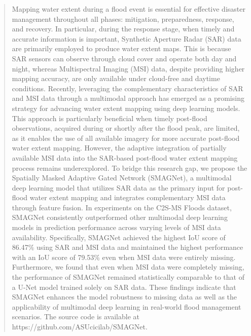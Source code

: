 \documentclass[preprint,12pt,authoryear]{elsarticle}
\begin{document}
\begin{frontmatter}
\begin{abstract}
Mapping water extent during a flood event is essential for effective disaster management throughout all phases: mitigation, preparedness, response, and recovery. In particular, during the response stage, when timely and accurate information is important, Synthetic Aperture Radar (SAR) data are primarily employed to produce water extent maps. This is because SAR sensors can observe through cloud cover and operate both day and night, whereas Multispectral Imaging (MSI) data, despite providing higher mapping accuracy, are only available under cloud-free and daytime conditions. Recently, leveraging the complementary characteristics of SAR and MSI data through a multimodal approach has emerged as a promising strategy for advancing water extent mapping using deep learning models. This approach is particularly beneficial when timely post-flood observations, acquired during or shortly after the flood peak, are limited, as it enables the use of all available imagery for more accurate post-flood water extent mapping. However, the adaptive integration of partially available MSI data into the SAR-based post-flood water extent mapping process remains underexplored. To bridge this research gap, we propose the Spatially Masked Adaptive Gated Network (SMAGNet), a multimodal deep learning model that utilizes SAR data as the primary input for post-flood water extent mapping and integrates complementary MSI data through feature fusion. In experiments on the C2S-MS Floods dataset, SMAGNet consistently outperformed other multimodal deep learning models in prediction performance across varying levels of MSI data availability. Specifically, SMAGNet achieved the highest IoU score of 86.47\% using SAR and MSI data and maintained the highest performance with an IoU score of 79.53\% even when MSI data were entirely missing. Furthermore, we found that even when MSI data were completely missing, the performance of SMAGNet remained statistically comparable to that of a U-Net model trained solely on SAR data. These findings indicate that SMAGNet enhances the model robustness to missing data as well as the applicability of multimodal deep learning in real-world flood management scenarios. The source code is available at https://github.com/ASUcicilab/SMAGNet.
\end{abstract}



\end{frontmatter}
\end{document}
